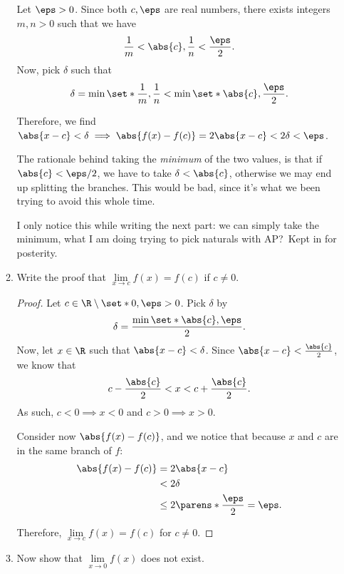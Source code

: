 \documentclass{article}
\begin{document}
\begin{enumerate}
\begin{enumerate}
                Let $\eps > 0$. Since both $c, \eps$ are real numbers, there exists integers $m,n > 0$  such that we have
                \[ \frac{1}{m} < \abs{c}, \frac{1}{n} < \frac{\eps}{2}. \]
                Now, pick $\delta$ such that
                \[
                \delta = \min\set*{\frac{1}{m}, \frac{1}{n}} < \min\set*{\abs{c}, \frac{\eps}{2}}.
                \]

                Therefore, we find $\abs{x - c} < \delta \implies \abs{f(x) - f(c)} = 2\abs{x - c} < 2\delta < \eps$.

                The rationale behind taking the \emph{minimum} of the two values, is that if $\abs{c} < \eps/2$,
                we have to take $\delta < \abs{c}$, otherwise we may end up splitting the branches. This would be bad,
                since it's what we been trying to avoid this whole time.

                I only notice this while writing the next part: we can simply take the minimum, what I am doing trying to
                pick naturals with AP?\ Kept in for posterity.

          \item Write the proof that $\lim\limits_{x \to c}f(x) = f(c)$ if $c \ne 0$.

                \begin{proof}
                  Let $c \in \R \setminus \set*{0}, \eps > 0$. Pick $\delta$ by
                  \[ \delta = \frac{\min\set*{\abs{c}, \eps}}{2}. \]
                  Now, let $x \in \R$ such that $\abs{x - c} < \delta$.
                  Since $\abs{x - c} < \frac{\abs{c}}{2}$, we know that
                  \[ c - \frac{\abs{c}}{2} < x < c + \frac{\abs{c}}{2}. \]
                  As such, $c < 0 \implies x < 0$ and $c > 0 \implies x > 0$.

                  Consider now $\abs{f(x) - f(c)}$, and we notice that because $x$ and $c$ are in the same branch of $f$:
                  \begin{align*}
                    \abs{f(x) - f(c)} &= 2\abs{x - c}\\
                    &< 2\delta\\
                    &\le 2\parens*{\frac{\eps}{2}} = \eps.
                  \end{align*}

                  Therefore, $\lim\limits_{x \to c}f(x) = f(c)$ for $c \ne 0$.
                \end{proof}

          \item Now show that $\lim\limits_{x \to 0}f(x)$ does not exist.


\end{enumerate}
\end{enumerate}
\end{document}
